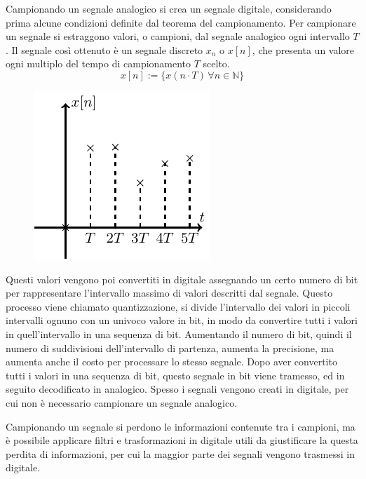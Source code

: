 \documentclass{article}
\numberwithin{equation}{subsection}
\begin{document}
Campionando un segnale analogico si crea un segnale digitale, considerando prima alcune condizioni definite dal teorema del campionamento. Per campionare un segnale si estraggono
valori, o campioni, dal segnale analogico ogni intervallo $T$. Il segnale così ottenuto è un segnale discreto $x_n$ o $x[n]$, che presenta un valore ogni multiplo del tempo di campionamento $T$ 
scelto. 
\begin{equation*}
    x[n]:=\{x(n\cdot T)\,\forall n\in\mathbb{N}\}
\end{equation*}

\begin{figure}[H]%
    \centering
    \includegraphics{segnale-discreto-1.pdf}%
    \label{fig:segnale-discreto-1}
\end{figure}

Questi valori vengono poi convertiti in digitale assegnando un certo numero di bit per rappresentare l'intervallo massimo di valori descritti dal segnale. Questo processo 
viene chiamato quantizzazione, si divide l'intervallo dei valori in piccoli intervalli ognuno con un univoco valore in bit, in modo da convertire tutti i valori in quell'intervallo in una sequenza di bit. Aumentando il numero di bit, quindi il numero di suddivisioni dell'intervallo di partenza, aumenta la precisione, ma aumenta anche il costo 
per processare lo stesso segnale. Dopo aver convertito tutti i valori in una sequenza di bit, questo segnale in bit viene tramesso, ed in seguito decodificato in analogico. 
Spesso i segnali vengono creati in digitale, per cui non è necessario campionare un segnale analogico. 


Campionando un segnale si perdono le informazioni contenute tra i campioni, ma è possibile applicare filtri e trasformazioni in digitale utili da giustificare la questa perdita 
di informazioni, per cui la maggior parte dei segnali vengono trasmessi in digitale. 
\end{document}
